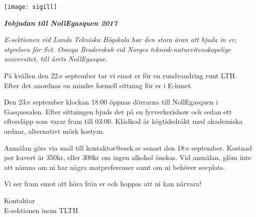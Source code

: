 \documentclass[11pt]{article}
\makeatletter
\def\date{2017}
\def\doctitle{Inbjudan till NollEgasquen \date}
\newcommand{\inviteto}[1]{

    \begin{center}
        \texttt{[image: sigill]}
        \par
        \vspace*{7mm}

        \textit{\textbf{\huge \doctitle}}
    \end{center}

    {\it
    E-sektionen vid Lunds Tekniska Högskola har den stora äran att bjuda in er, {#1}, till årets NollEgasque.

    På kvällen den 22:e september tar vi emot er för en rundvandring runt LTH. Efter det anordnas en mindre formell sittning för er i E-huset.

    Den 23:e september klockan 18:00 öppnas dörrarna till NollEgasquen i Gasquesalen. Efter sittningen bjuds det på en fyrverkerishow och sedan ett eftersläpp som varar fram till 03:00. Klädkod är högtidsdräkt med akademiska ordnar, alternativt mörk kostym.

    Anmälan görs via mail till kontaktor@esek.se senast den 18:e september. Kostnad per kuvert är 350kr, eller 300kr om ingen alkohol önskas. Vid anmälan, glöm inte att nämna om ni har några matpreferenser samt om ni behöver sovplats.

    Vi ser fram emot att höra från er och hoppas att ni kan närvara!
    }

    \begin{signatures}{1}
    \signature{Johan Karlberg}{Kontaktor\\E-sektionen inom TLTH}
  \end{signatures}}
\makeatother
\begin{document}
  \inviteto{styrelsen för Sct. Omega Broderskab vid Norges teknisk-naturvitenskapelige universitet}
\end{document}
